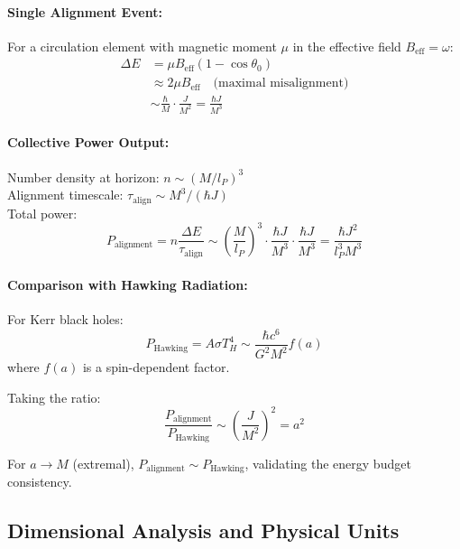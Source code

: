 \documentclass[11pt]{article}
\begin{document}
\paragraph{Single Alignment Event:}
For a circulation element with magnetic moment $\mu$ in the effective field $B_{\text{eff}} = \omega$:
\begin{align}
\Delta E &= \mu B_{\text{eff}}(1 - \cos\theta_0)\\
&\approx 2\mu B_{\text{eff}} \quad \text{(maximal misalignment)}\\
&\sim \frac{\hbar}{M} \cdot \frac{J}{M^2} = \frac{\hbar J}{M^3}
\end{align}

\paragraph{Collective Power Output:}
Number density at horizon: $n \sim (M/l_P)^3$\\
Alignment timescale: $\tau_{\text{align}} \sim M^3/(\hbar J)$\\
Total power:
\begin{equation}
P_{\text{alignment}} = n\frac{\Delta E}{\tau_{\text{align}}} \sim \left(\frac{M}{l_P}\right)^3 \cdot \frac{\hbar J}{M^3} \cdot \frac{\hbar J}{M^3} = \frac{\hbar J^2}{l_P^3 M^3}
\end{equation}

\paragraph{Comparison with Hawking Radiation:}
For Kerr black holes:
\begin{equation}
P_{\text{Hawking}} = A \sigma T_H^4 \sim \frac{\hbar c^6}{G^2 M^2} f(a)
\end{equation}
where $f(a)$ is a spin-dependent factor.

Taking the ratio:
\begin{equation}
\frac{P_{\text{alignment}}}{P_{\text{Hawking}}} \sim \left(\frac{J}{M^2}\right)^2 = a^2
\end{equation}

For $a \to M$ (extremal), $P_{\text{alignment}} \sim P_{\text{Hawking}}$, validating the energy budget consistency.

\subsection{Dimensional Analysis and Physical Units}
\end{document}
